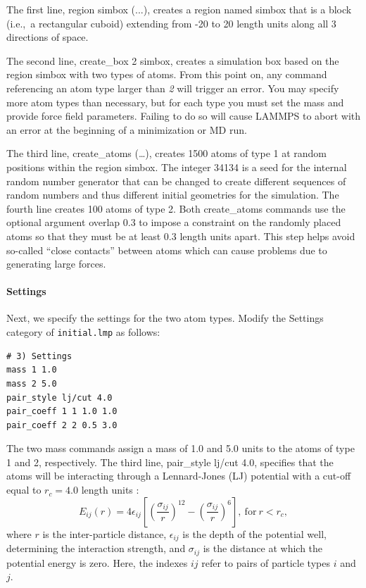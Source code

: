 \documentclass[9pt,tutorial]{livecoms}
\newcommand{\lmpcmd}[1]{\hspace{0pt}\colorbox{listing}{\textcolor{command}{\small{#1}}}\hspace{0pt}} %
\newcommand{\flecmd}[1]{\textcolor{command}{\texttt{#1}}} %
\begin{document}
The first line, \lmpcmd{region simbox (...)}, creates a region
named \lmpcmd{simbox} that is a block (i.e.,~a rectangular
cuboid) extending from -20 to 20 length units along all 3 directions
of space.  %

The second line, \lmpcmd{create\_box 2 simbox}, creates a simulation box
based on the region \lmpcmd{simbox} with two types of atoms.  From this
point on, any command referencing an atom type larger than \textit{2}
will trigger an error.  You may specify more atom types than
necessary, but for each type you must set the mass and provide
force field parameters.  Failing to do so will cause LAMMPS to abort with an
error at the beginning of a minimization or MD run.

The third line, \lmpcmd{create\_atoms (\dots)}, creates 1500 atoms of type
1 at random positions within the region
\lmpcmd{simbox}.  The integer 34134 is a seed for the
internal random number generator that can be changed to create different
sequences of random numbers and thus different initial geometries for
the simulation.  The fourth line creates 100 atoms of type 2.
Both \lmpcmd{create\_atoms} commands use the optional argument
\lmpcmd{overlap 0.3} to impose a constraint on the randomly placed atoms
so that they must be at least 0.3 length units apart.  This step helps avoid
so-called ``close contacts'' between atoms which can cause
problems due to generating large forces.

\paragraph{Settings}

Next, we specify the settings for the two atom types.  Modify the
\lmpcmd{Settings} category of \flecmd{initial.lmp} as follows:
\begin{lstlisting}
# 3) Settings
mass 1 1.0
mass 2 5.0
pair_style lj/cut 4.0
pair_coeff 1 1 1.0 1.0
pair_coeff 2 2 0.5 3.0
\end{lstlisting}

The two \lmpcmd{mass} commands assign a mass of 1.0 and 5.0 units
to the atoms of type 1 and 2, respectively.  The third line,
\lmpcmd{pair\_style lj/cut 4.0}, specifies that the atoms
will be interacting through a Lennard-Jones (LJ) potential with a
cut-off equal to $r_c = 4.0$ length units
\cite{wang2020lennard,fischer2023history}:
$$E_{ij} (r) = 4 \epsilon_{ij} \left[ \left( \dfrac{\sigma_{ij}}{r} \right)^{12}
  - \left( \dfrac{\sigma_{ij}}{r} \right)^{6} \right], ~ \text{for} ~ r
< r_c,$$ where $r$ is the inter-particle distance, $\epsilon_{ij}$ is
the depth of the potential well, determining the interaction strength, and
$\sigma_{ij}$ is the distance at which the potential energy is zero.
Here, the indexes $ij$ refer to pairs of particle types $i$ and $j$.
\end{document}

